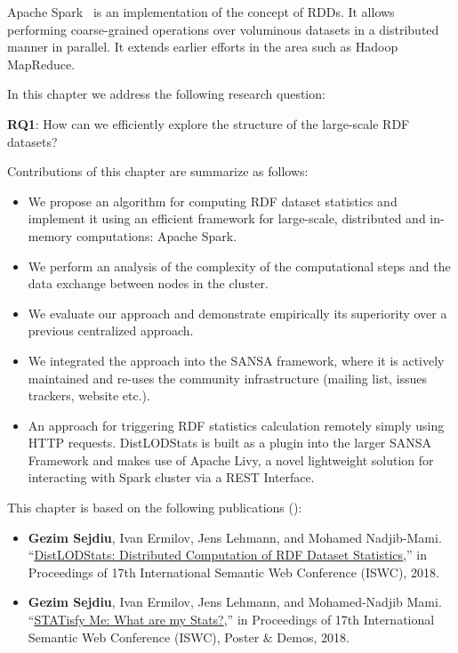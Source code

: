 Apache Spark~ is an implementation of the concept of \gls{RDD}s.
It allows performing coarse-grained operations over voluminous datasets in a distributed manner in parallel.
It extends earlier efforts in the area such as Hadoop MapReduce.


In this chapter we address the following research question:
\begin{tcolorbox}
\textbf{RQ1}: How can we efficiently explore the structure of the large-scale RDF datasets?
\end{tcolorbox}

Contributions of this chapter are summarize as follows:
\begin{itemize}
    \item We propose an algorithm for computing RDF dataset statistics and implement it using an efficient framework for large-scale, distributed and in-memory computations: Apache Spark.
    \item We perform an analysis of the complexity of the computational steps and the data exchange between nodes in the cluster. 
    \item We evaluate our approach and demonstrate empirically its superiority over a previous centralized approach.
    \item We integrated the approach into the SANSA framework, where it is actively maintained and re-uses the community infrastructure (mailing list, issues trackers, website etc.).
    \item An approach for triggering RDF statistics calculation remotely simply using HTTP requests. 
    DistLODStats is built as a plugin into the larger SANSA Framework and makes use of Apache Livy, a novel lightweight solution for interacting with Spark cluster via a REST Interface.
\end{itemize}

This chapter is based on the following publications (\cite{sejdiu-2018-dist-lod-stats-iswc,sejdiu-2018-statisfy-iswc-poster}):
\begin{itemize}
    \item \textbf{Gezim Sejdiu}, Ivan Ermilov, Jens Lehmann, and Mohamed Nadjib-Mami. “\href{http://jens-lehmann.org/files/2018/iswc_distlodstats.pdf}{DistLODStats: Distributed Computation of RDF Dataset Statistics},” in Proceedings of 17th International Semantic Web Conference (ISWC), 2018.
   
    \item \textbf{Gezim Sejdiu}, Ivan Ermilov, Jens Lehmann, and Mohamed-Nadjib Mami. “\href{http://jens-lehmann.org/files/2018/iswc_statisfy_pd.pdf}{STATisfy Me: What are my Stats?},” in Proceedings of 17th International Semantic Web Conference (ISWC), Poster \& Demos, 2018.
\end{itemize}

